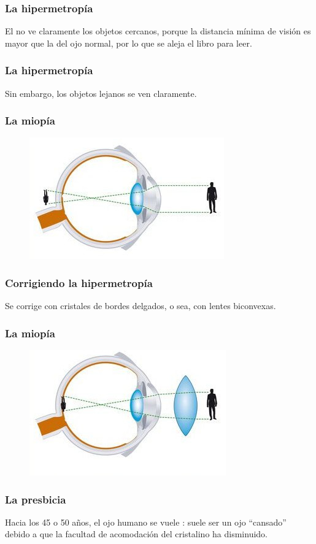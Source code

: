 \documentclass[14pt]{beamer}
\begin{document}
\begin{frame}
\frametitle{La hipermetropía}
El  no ve claramente los objetos cercanos, \pause porque la distancia mínima de visión
es mayor que la del ojo normal, por lo que se aleja el libro para leer.
\end{frame}
\begin{frame}
\frametitle{La hipermetropía}
Sin embargo, los objetos lejanos se ven claramente.
\end{frame}
\begin{frame}
\frametitle{La miopía}
\begin{figure}
    \centering
    \includegraphics[scale=3.35]{Imagenes/Defectos_Vision_02_Hipermetropia_01.jpg}
\end{figure}
\end{frame}
\begin{frame}
\frametitle{Corrigiendo la hipermetropía}
Se corrige con cristales de bordes delgados, o sea, con lentes biconvexas.
\end{frame}
\begin{frame}
\frametitle{La miopía}
\begin{figure}
    \centering
    \includegraphics[scale=3.35]{Imagenes/Defectos_Vision_02_Hipermetropia_02.jpg}
\end{figure}
\end{frame}
\begin{frame}
\frametitle{La presbicia}
Hacia los 45 o 50 años, el ojo humano se vuele : \pause suele ser un ojo \enquote{cansado} debido a
que la facultad de acomodación del cristalino ha disminuido.
\end{frame}
\end{document}
